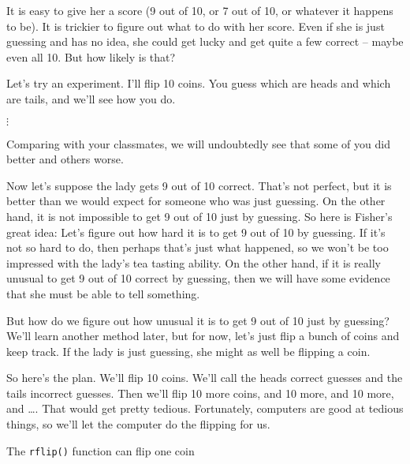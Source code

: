 It is easy to give her a score (9 out of 10, or 7 out of 10, or whatever
it happens to be).  It is trickier to figure out what to do with her score.
Even if she is just guessing and has no idea, she could get lucky and 
get quite a few correct -- maybe even all 10.  But how likely is that?

Let's try an experiment.  I'll flip 10 coins.  You guess which are heads and
which are tails, and we'll see how you do.  

$\vdots$

Comparing with your classmates, we will undoubtedly see that some 
of you did better and others worse.

Now let's suppose the lady gets 9 out of 10 correct.  That's not perfect,
but it is better than we would expect for someone who was just guessing.
On the other hand, it is not impossible to get 9 out of 10 just by guessing.
So here is Fisher's great idea:  Let's figure out how hard it is to get
9 out of 10 by guessing.  If it's not so hard to do, then perhaps that's 
just what happened, so we won't be too impressed with the lady's tea tasting
ability.  On the other hand, if it is really unusual to get 9 out of 10 
correct by guessing, then we will have some evidence that she must 
be able to tell something.

But how do we figure out how unusual it is to get 9 out of 10 just by 
guessing?  We'll learn another method later, but for now, let's just 
flip a bunch of coins and keep track.  If the lady is just guessing, she 
might as well be flipping a coin.

So here's the plan.  We'll flip 10 coins.  We'll call the heads correct 
guesses and the tails incorrect guesses.  Then we'll flip 10 more coins,
and 10 more, and 10 more, and \dots.  That would get pretty tedious.
Fortunately, computers are good at tedious things, so we'll let the computer 
do the flipping for us.

The \verb!rflip()! function can flip one coin

\begin{knitrout}
\end{knitrout}

